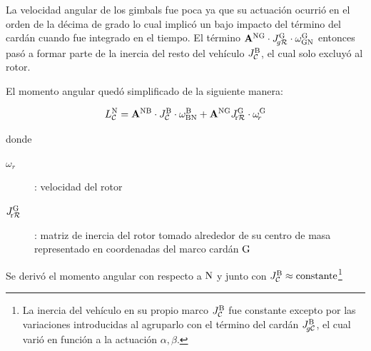 La velocidad angular de los gimbals fue poca ya que su actuación ocurrió en el orden de la décima de grado lo cual implicó un bajo impacto del término del cardán cuando fue integrado en el tiempo. El término  $\mathbf{A}^{\mathrm{NG}} \cdot J_{\!g\mathcal{R}}^{\mathrm{G}} \cdot \omega_{\mathrm{GN}}^{\mathrm{G}}$ entonces pasó a formar parte de la inercia del resto del vehículo $J_{\mathcal{C}}^{\mathrm{B}}$, el cual solo excluyó al rotor.



El momento angular quedó simplificado de la siguiente manera:


\begin{equation}
	L_{\mathcal{C}}^{\mathrm{N}} = \mathbf{A}^{\mathrm{{NB}}} \cdot J_{\mathcal{C}}^{\mathrm{B}} \cdot \omega_{\mathrm{BN}}^{\mathrm{B}} +\mathbf{A}^{\mathrm{NG}} J_{\mathcal{\!\mathrm{r}R}}^{\mathrm{G}} \cdot \omega_{\!r}^{\mathrm{G}}
\end{equation}

donde
\begin{description}
	\item[$\omega_{\!r}$] : velocidad del rotor
	\item[$J_{\mathcal{\!\mathrm{r}R}}^{\mathrm{G}}$] : matriz de inercia del rotor tomado alrededor de su centro de masa representado en coordenadas del marco cardán $\mathrm{G}$
\end{description}


Se derivó el momento angular con respecto a $\mathrm{N}$ y junto con $J_{\mathcal{C}}^{\mathrm{B}} \approx \text{constante}$\footnote{La inercia del vehículo en su propio marco $J_{\mathcal{C}}^{\mathrm{B}}$ fue constante excepto por las variaciones introducidas al agruparlo con el término del cardán $J_{\!g\mathcal{C}}^{\mathrm{B}}$, el cual varió en función a la actuación $\alpha,\beta$.}

